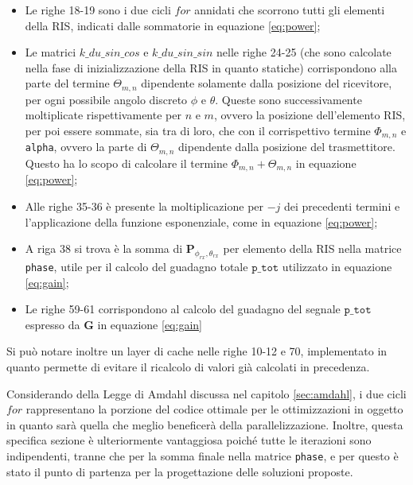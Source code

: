 \begin{itemize}
  \item Le righe 18-19 sono i due cicli $for$ annidati che scorrono tutti gli elementi
    della RIS, indicati dalle sommatorie in equazione \ref{eq:power};

  \item Le matrici $k\_du\_sin\_cos$ e $k\_du\_sin\_sin$ nelle righe 24-25 (che
    sono calcolate nella fase di inizializzazione della RIS in quanto statiche) corrispondono
    alla parte del termine $\Theta_{m,n}$ dipendente solamente dalla posizione del
    ricevitore, per ogni possibile angolo discreto $\phi$ e $\theta$. Queste sono
    successivamente moltiplicate rispettivamente per $n$ e $m$, ovvero la
    posizione dell'elemento RIS, per poi essere sommate, sia tra di loro, che con
    il corrispettivo termine $\Phi_{m,n}$ e \texttt{alpha}, ovvero la parte di $\Theta
    _{m,n}$ dipendente dalla posizione del trasmettitore. Questo ha lo scopo di
    calcolare il termine $\Phi_{m,n}+\Theta_{m,n}$ in equazione \ref{eq:power};

  \item Alle righe 35-36 è presente la moltiplicazione per $-j$ dei precedenti termini
    e l'applicazione della funzione esponenziale, come in equazione
    \ref{eq:power};

  \item A riga 38 si trova è la somma di $\textbf{P}_{\phi_{rx},\theta_{rx}}$ per
    elemento della RIS nella matrice \texttt{phase}, utile per il calcolo del guadagno
    totale $\texttt{p\_tot}$ utilizzato in equazione \ref{eq:gain};

  \item Le righe 59-61 corrispondono al calcolo del guadagno del segnale $\texttt
    {p\_tot}$ espresso da $\textbf{G}$ in equazione \ref{eq:gain}
\end{itemize}

Si può notare inoltre un layer di cache nelle righe 10-12 e 70, implementato in
quanto permette di evitare il ricalcolo di valori già calcolati in precedenza.

Considerando della Legge di Amdahl discussa nel capitolo \ref{sec:amdahl}, i due
cicli $for$ rappresentano la porzione del codice ottimale per le ottimizzazioni in
oggetto in quanto sarà quella che meglio beneficerà della parallelizzazione.
Inoltre, questa specifica sezione è ulteriormente vantaggiosa poiché tutte le iterazioni
sono indipendenti, tranne che per la somma finale nella matrice \texttt{phase},
e per questo è stato il punto di partenza per la progettazione delle soluzioni
proposte.

